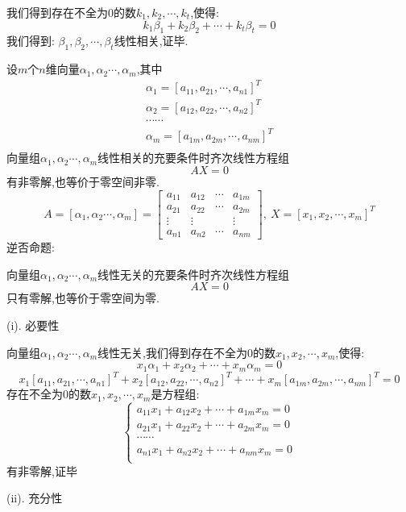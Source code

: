 \begin{theorem}[判别线性相关性的七大定理]
\begin{anymark}[证明]
		我们得到存在不全为$0$的数$k_{1},k_{2},\cdots,k_{t}$,使得:  
		$$k_{1}\beta_{1}+k_{2}\beta_{2}+\cdots+k_{t}\beta_{t}=0$$
		我们得到:  $\beta_{1},\beta_{2},\cdots,\beta_{t}$线性相关,证毕.
	\end{anymark}
	
	设$m$个$n$维向量$\alpha_{1},\alpha_{2}\cdots,\alpha_{m}$,其中
	$$
	\begin{array}{l}
		\alpha_{1}=[a_{11},a_{21},\cdots,a_{n1}]^{T}\\
		\alpha_{2}=[a_{12},a_{22},\cdots,a_{n2}]^{T}\\
		\cdots\cdots\\
		\alpha_{m}=[a_{1m},a_{2m},\cdots,a_{nm}]^{T}\\
	\end{array}
	$$
	向量组$\alpha_{1},\alpha_{2}\cdots,\alpha_{m}$线性相关的充要条件时齐次线性方程组
	$$AX=0$$
	有非零解,也等价于零空间非零.
	$$A=[\alpha_{1},\alpha_{2}\cdots,\alpha_{m}]=\left[ \begin{matrix}
		a_{11}&a_{12}&\cdots&a_{1m}\\
		a_{21}&a_{22}&\cdots&a_{2m}\\
		\vdots&\vdots& &\vdots\\
		a_{n1}&a_{n2}&\cdots&a_{nm}
	\end{matrix}\right],\ X=[x_{1},x_{2},\cdots,x_{m}]^{T}$$
	逆否命题:  
	
	向量组$\alpha_{1},\alpha_{2}\cdots,\alpha_{m}$线性无关的充要条件时齐次线性方程组
	$$AX=0$$
	只有零解,也等价于零空间为零.
	\begin{anymark}[证明]
		(i). 必要性
		
		向量组$\alpha_{1},\alpha_{2}\cdots,\alpha_{m}$线性无关,我们得到存在不全为$0$的数$x_{1},x_{2},\cdots,x_{m}$,使得:  
		$$x_{1}\alpha_{1}+x_{2}\alpha_{2}+\cdots+x_{m}\alpha_{m}=0$$
		$$x_{1}[a_{11},a_{21},\cdots,a_{n1}]^{T}+x_{2}[a_{12},a_{22},\cdots,a_{n2}]^{T}+\cdots+x_{m}[a_{1m},a_{2m},\cdots,a_{nm}]^{T}=0$$
		存在不全为$0$的数$x_{1},x_{2},\cdots,x_{m}$是方程组:  
		$$\left\lbrace 
		\begin{array}{l}
			a_{11}x_{1}+a_{12}x_{2}+\cdots+a_{1m}x_{m}=0\\
			a_{21}x_{1}+a_{22}x_{2}+\cdots+a_{2m}x_{m}=0\\
			\cdots\cdots\\
			a_{n1}x_{1}+a_{n2}x_{2}+\cdots+a_{nm}x_{m}=0\\
		\end{array}
		\right. $$
		有非零解,证毕
		
		(ii). 充分性
		

\end{anymark}
\end{theorem}
